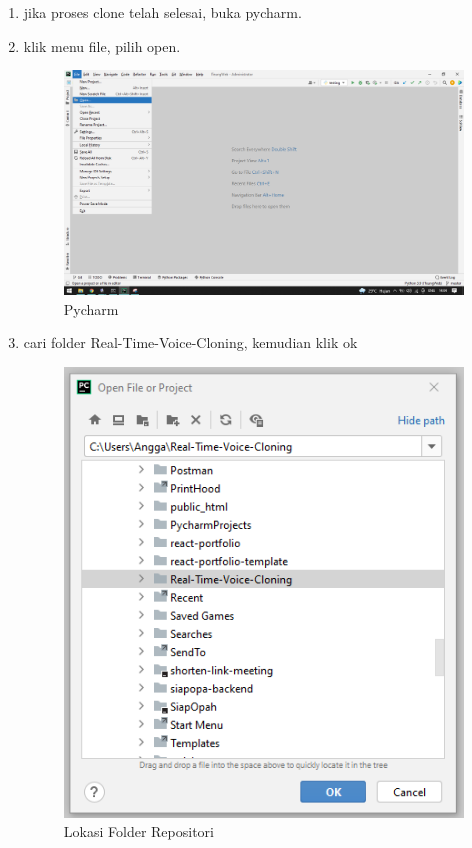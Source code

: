 \begin{enumerate}
\item jika proses clone telah selesai, buka pycharm.

\item klik menu file, pilih open.
\begin{figure}[H]
\centering
\includegraphics[scale=.2]{figures/repo6}
\caption{Pycharm}
\label{repo6}
\end{figure}

\item cari folder Real-Time-Voice-Cloning, kemudian klik ok
\begin{figure}[H]
\centering
\includegraphics[scale=.55]{figures/repo7}
\caption{Lokasi Folder Repositori}
\label{repo7}
\end{figure}


\end{enumerate}
